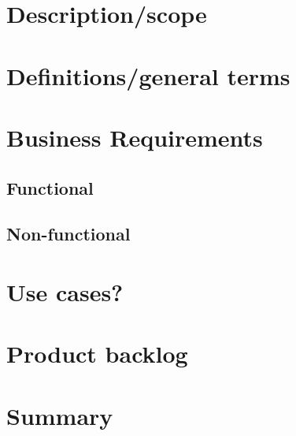 \section{Description/scope}
\section{Definitions/general terms}
\section{Business Requirements}
\subsection{Functional}
\subsection{Non-functional}
\section{Use cases?}
\section{Product backlog}
\section{Summary}